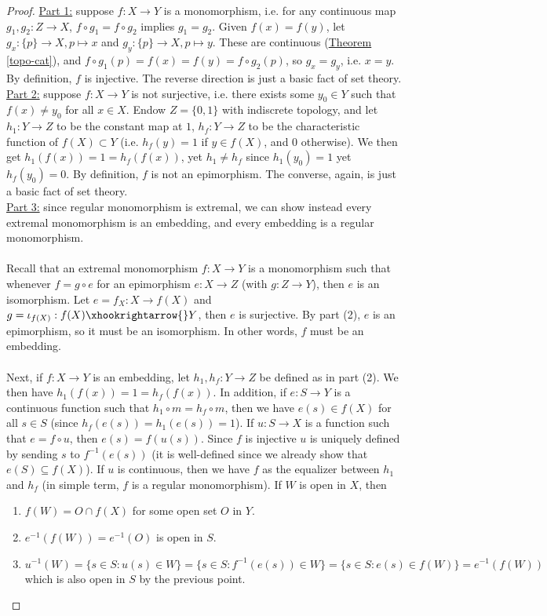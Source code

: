 \documentclass{treatise}
\begin{document}
\begin{proof}
\underline{Part 1:} suppose $f: X \to Y$ is a monomorphism, i.e. for any continuous map $g_1, g_2 : Z \to X$, $f \circ g_1 = f \circ g_2$ implies $g_1 = g_2$. Given $f(x) = f(y)$, let $g_x : \{ p \} \to X, p \mapsto x$ and $g_y: \{ p \} \to X, p \mapsto y$. These are continuous (\hyperref[topo-cat]{Theorem \ref*{topo-cat}}), and $f \circ g_1 (p) = f(x) = f(y) = f \circ g_2 (p)$, so $g_x = g_y$, i.e. $x = y$. By definition, $f$ is injective. The reverse direction is just a basic fact of set theory.
\\
\underline{Part 2:} suppose $f: X \to Y$ is not surjective, i.e. there exists some $y_0 \in Y$ such that $f(x) \neq y_0$ for all $x \in X$. Endow $Z = \{ 0, 1 \}$ with indiscrete topology, and let $h_1 : Y \to Z$ to be the constant map at $1$, $h_f : Y \to Z$ to be the characteristic function of $f(X) \subset Y$ (i.e. $h_f (y) = 1$ if $y \in f(X)$, and $0$ otherwise). We then get $h_1(f(x)) = 1 = h_f (f(x))$, yet $h_1 \neq h_f$ since $h_1(y_0) = 1$ yet $h_f(y_0) = 0$. By definition, $f$ is not an epimorphism. The converse, again, is just a basic fact of set theory.
\\
\underline{Part 3:} since regular monomorphism is extremal, we can show instead every extremal monomorphism is an embedding, and every embedding is a regular monomorphism.
\\
\\
Recall that an extremal monomorphism $f: X \to Y$ is a monomorphism such that whenever $f = g \circ e$ for an epimorphism $e: X \to Z$ (with $g: Z \to Y$), then $e$ is an isomorphism. Let $e = f_X : X \to f(X)$ and $g = \iota_{f(X)} : f(X) \xhookrightarrow{} Y$, then $e$ is surjective. By part (2), $e$ is an epimorphism, so it must be an isomorphism. In other words, $f$ must be an embedding.
\\
\\
Next, if $f: X \to Y$ is an embedding, let $h_1, h_f : Y \to Z$ be defined as in part (2). We then have $h_1(f(x)) = 1 = h_f(f(x))$. In addition, if $e: S \to Y$ is a continuous function such that $h_1 \circ m = h_f \circ m$, then we have $e(s) \in f(X)$ for all $s \in S$ (since $h_f(e(s)) = h_1 (e(s)) = 1$). If $u: S \to X$ is a function such that $e = f \circ u$, then $e(s) = f(u(s))$. Since $f$ is injective $u$ is uniquely defined by sending $s$ to $f^{-1}(e(s))$ (it is well-defined since we already show that $e(S) \subseteq f(X)$). If $u$ is continuous, then we have $f$ as the equalizer between $h_1$ and $h_f$ (in simple term, $f$ is a regular monomorphism). If $W$ is open in $X$, then
\begin{enumerate}
    \item $f(W) = O \cap f(X)$ for some open set $O$ in $Y$.
    \item $e^{-1}(f(W)) = e^{-1}(O)$ is open in $S$.
    \item $u^{-1}(W) = \{ s \in S : u(s) \in W \} = \{ s \in S : f^{-1}(e(s)) \in W \} = \{ s \in S : e(s) \in f(W) \} = e^{-1}(f(W))$ which is also open in $S$ by the previous point.
\end{enumerate}
\end{proof}
\end{document}
